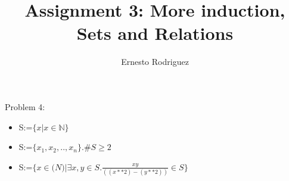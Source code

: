 \documentclass{article}
\title{Assignment 3: More induction, Sets and Relations}
\author{Ernesto Rodriguez}
\begin{document}
\maketitle

Problem 4:

\begin{itemize}

\item{S:=$\{x|x \in \mathbb{N}\}$}
\item{S:=$\{x_1,x_2,..,x_n\}.\#S \ge 2$}
\item{S:=$\{x \in \mathbb(N) | \exists x,y \in S. \frac{xy}{((x**2)-(y**2))} \in S\}$}
\end{itemize}
\end{document}
